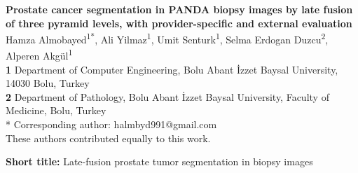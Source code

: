 \documentclass[10pt,letterpaper]{article}
\begin{document}
\vspace*{0.2in}

\begin{flushleft}
{\Large
\textbf{Prostate cancer segmentation in PANDA biopsy images by late fusion of three pyramid levels, with provider-specific and external evaluation
}
\newline
\\
Hamza Almobayed\textsuperscript{1*\ddag},
Ali Yilmaz\textsuperscript{1\ddag},
Umit Senturk\textsuperscript{1\ddag},
Selma Erdogan Duzcu\textsuperscript{2},
Alperen Akgül\textsuperscript{1\ddag}
\\
\bigskip
\textbf{1} Department of Computer Engineering, Bolu Abant İzzet Baysal University, 14030 Bolu, Turkey
\\
\textbf{2} Department of Pathology, Bolu Abant İzzet Baysal University, Faculty of Medicine, Bolu, Turkey
\\
\bigskip
* Corresponding author: halmbyd991@gmail.com \\
\ddag These authors contributed equally to this work.
}
\end{flushleft}
\noindent\textbf{Short title:} Late-fusion prostate tumor segmentation in biopsy images
\end{document}
